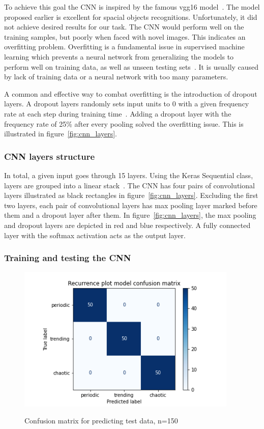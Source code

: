 \documentclass[a4paper,12pt,fleqn]{article}
\begin{document}
To achieve this goal the CNN is inspired by the famous vgg16 model~\cite{brusilovsky:simonyan2014very}.
The model proposed earlier is excellent for spacial objects recognitions.
Unfortunately, it did not achieve desired results for our task.
The CNN would perform well on the training samples, but poorly when faced with novel images.
This indicates an overfitting problem.
Overfitting is a fundamental issue in supervised machine learning which prevents a neural network from generalizing the models to perform well on training data, as well as unseen testing sets~\cite{overfitting}.
It is usually caused by lack of training data or a neural network with too many parameters.

A common and effective way to combat overfitting is the introduction of dropout layers.
A dropout layers randomly sets input units to 0 with a given frequency rate at each step during training time~\cite{dropout}.
Adding a dropout layer with the frequency rate of 25\% after every pooling solved the overfitting issue.
This is illustrated in figure~\ref{fig:cnn_layers}.


\subsubsection{CNN layers structure}
In total, a given input goes through 15 layers.
Using the Keras Sequential class, layers are grouped into a linear stack~\cite{sequential}.
The CNN has four pairs of convolutional layers illustrated as black rectangles in figure~\ref{fig:cnn_layers}.
Excluding the first two layers, each pair of convolutional layers has max pooling layer marked before them and a dropout layer after them.
In figure~\ref{fig:cnn_layers}, the max pooling and dropout layers are depicted in red and blue respectively.
A fully connected layer with the softmax activation acts as the output layer.


\subsubsection{Training and testing the CNN}

\begin{figure}[h]
  \centering
  {\includegraphics[height=7cm]{assets/confusion_matrix.png}}
  \caption{Confusion matrix for predicting test data, n=150}
  \label{fig:confusion_matrix}
\end{figure}
\end{document}
